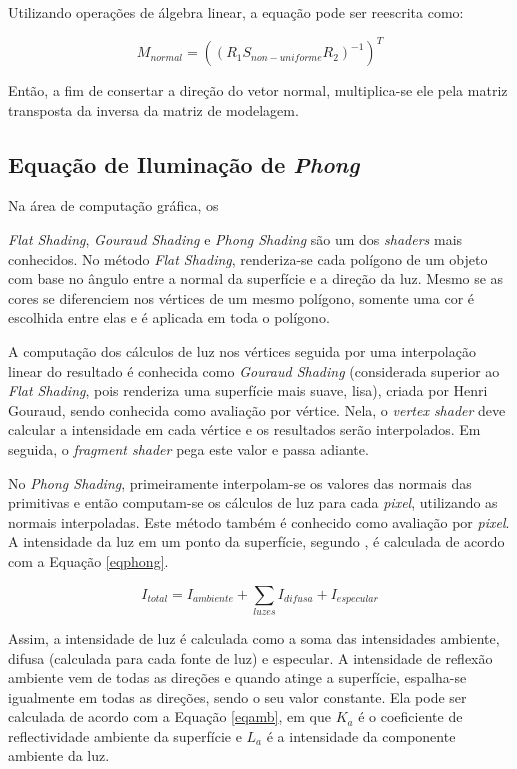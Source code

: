 	Utilizando operações de álgebra linear, a equação pode ser reescrita como:

	\begin{equation}
		M_ {normal} = ((R_ {1} S_ {non-uniforme} R_ {2})^{-1})^{T}
	\label{eqtrans3}
	\end{equation}
	
	Então, a fim de consertar a direção do vetor normal, multiplica-se ele pela matriz transposta da inversa da matriz de modelagem.  

	\subsection{Equação de Iluminação de \textit{Phong}}
	\label{flatgouphon}

	Na área de computação gráfica, os {\textit{Flat Shading}, \textit{Gouraud Shading} e \textit{Phong Shading} são um dos \textit{shaders} mais conhecidos. No método \textit{Flat Shading}, renderiza-se cada polígono de um objeto com base no ângulo entre a normal da superfície e a direção da luz. Mesmo se as cores se diferenciem nos vértices de um mesmo polígono, somente uma cor é escolhida entre elas e é aplicada em toda o polígono.  

	A computação dos cálculos de luz nos  vértices seguida por uma interpolação linear do resultado é conhecida como \textit{Gouraud Shading} (considerada superior ao \textit{Flat Shading}, pois renderiza uma superfície mais suave, lisa), criada por Henri Gouraud, sendo conhecida como avaliação por vértice. Nela, o \textit{vertex shader} deve calcular a intensidade em cada vértice e os resultados serão interpolados. Em seguida, o \textit{fragment shader} pega este valor e passa adiante. 

	No \textit{Phong Shading}, primeiramente interpolam-se os valores das normais das primitivas e então computam-se os cálculos de luz para cada \textit{pixel}, utilizando as normais interpoladas. Este método também é conhecido como avaliação por \textit{pixel}. A intensidade da luz em um ponto da superfície, segundo \cite{guha2011}, é calculada de acordo com a Equação \ref{eqphong}.  

	\begin{equation}
		I_ {total} = I_ {ambiente} +  \sum\limits_ {luzes} I_ {difusa} + I_ {especular}
	\label{eqphong}
	\end{equation}

	Assim, a intensidade de luz é calculada como a soma das intensidades ambiente, difusa (calculada para cada fonte de luz) e especular.  A intensidade de reflexão ambiente vem de todas as direções e quando atinge a superfície, espalha-se igualmente em todas as direções, sendo o seu valor constante. Ela pode ser calculada de acordo com a Equação \ref{eqamb}, em que $K_ {a}$ é o coeficiente de reflectividade ambiente da superfície e $L_ {a}$ é a intensidade da componente ambiente da luz.

}
